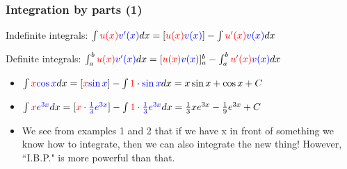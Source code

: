\begin{frame}
\frametitle{Integration by parts (1)}{\small
\vspace{-3mm}\begin{tcolorbox}[colback=yellow!50,colframe=violet!75!black,title=General form -- Integration By Parts]
{\small Indefinite integrals: $\int \textcolor{red}{u(x)}\textcolor{blue}{v'(x)}dx=[\textcolor{red}{u(x)}\textcolor{blue}{v(x)}]-\int \textcolor{red}{u'(x)}\textcolor{blue}{v(x)}dx$

Definite integrals: $\int_a^b \textcolor{red}{u(x)}\textcolor{blue}{v'(x)}dx=[\textcolor{red}{u(x)}\textcolor{blue}{v(x)}]_a^b-\int_a^b \textcolor{red}{u'(x)}\textcolor{blue}{v(x)}dx$}
\end{tcolorbox}
\begin{itemize}
    \item\pause $\int \textcolor{red}{x}\textcolor{blue}{\cos x} dx = [\textcolor{red}{x}\textcolor{blue}{\sin x}] - \int \textcolor{red}{1}\cdot\textcolor{blue}{\sin x} dx = x\sin x + \cos x + C$
    \item\pause $\int \textcolor{red}{x}\textcolor{blue}{e^{3x}} dx=[\textcolor{red}{x}\cdot\textcolor{blue}{\frac{1}{3}e^{3x}}]-\int \textcolor{red}{1}\cdot\textcolor{blue}{\frac{1}{3}e^{3x}} dx=\frac{1}{3}xe^{3x}-\frac{1}{9}e^{3x}+C$
    \item We see from examples 1 and 2 that if we have x in front of something we know how to integrate, then we can also integrate the new thing! However, ``I.B.P." is more powerful than that.
\end{itemize}
}\end{frame}


